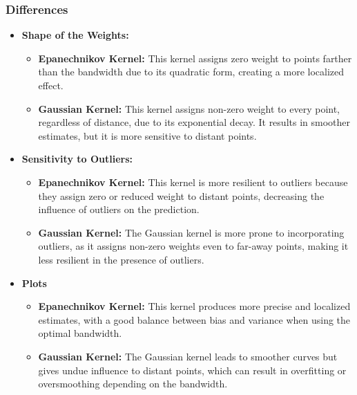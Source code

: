 \subsubsection{Differences}
\begin{itemize}
	\item \textbf{Shape of the Weights:}
	      \begin{itemize}
		      \item \textbf{Epanechnikov Kernel:} This kernel assigns
		            zero weight to points farther than the bandwidth due
		            to its quadratic form, creating a more localized
		            effect.
		      \item \textbf{Gaussian Kernel:} This kernel assigns
		            non-zero weight to every point, regardless of
		            distance, due to its exponential decay. It results in
		            smoother estimates, but it is more sensitive to
		            distant points.
	      \end{itemize}

	\item \textbf{Sensitivity to Outliers:}
	      \begin{itemize}
		      \item \textbf{Epanechnikov Kernel:} This kernel is more
		            resilient to outliers because they assign zero or
		            reduced weight to distant points, decreasing the
		            influence of outliers on the prediction.
		      \item \textbf{Gaussian Kernel:} The Gaussian kernel is
		            more prone to incorporating outliers, as it assigns
		            non-zero weights even to far-away points, making it
		            less resilient in the presence of outliers.
	      \end{itemize}
	\item \textbf{Plots}
	      \begin{itemize}
		      \item \textbf{Epanechnikov Kernel:} This kernel produces
		            more precise and localized estimates, with a good
		            balance between bias and variance when using the
		            optimal bandwidth.
		      \item \textbf{Gaussian Kernel:} The Gaussian kernel leads
		            to smoother curves but gives undue influence to
		            distant points, which can result in overfitting or
		            oversmoothing depending on the bandwidth.
	      \end{itemize}
\end{itemize}
